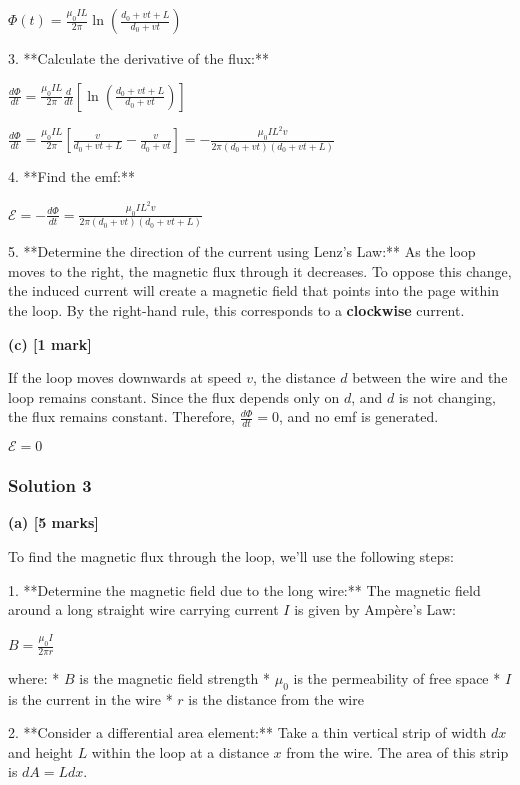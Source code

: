 \documentclass{article}
\begin{document}
   $\Phi(t) = \frac{\mu_0 I L}{2 \pi} \ln \left( \frac{d_0 + vt + L}{d_0 + vt} \right)$

3. **Calculate the derivative of the flux:** 

   $\frac{d\Phi}{dt} = \frac{\mu_0 I L}{2 \pi} \frac{d}{dt} \left[ \ln \left( \frac{d_0 + vt + L}{d_0 + vt} \right) \right]$

   $\frac{d\Phi}{dt} = \frac{\mu_0 I L}{2 \pi} \left[ \frac{v}{d_0 + vt + L} - \frac{v}{d_0 + vt} \right] = -\frac{\mu_0 I L^2 v}{2 \pi (d_0 + vt)(d_0 + vt + L)}$

4. **Find the emf:**

   $\mathcal{E} = -\frac{d\Phi}{dt} = \boxed{\frac{\mu_0 I L^2 v}{2 \pi (d_0 + vt)(d_0 + vt + L)}}$

5. **Determine the direction of the current using Lenz's Law:** As the loop moves to the right, the magnetic flux through it decreases.  To oppose this change, the induced current will create a magnetic field that points into the page within the loop. By the right-hand rule, this corresponds to a \textbf{clockwise} current.


\textbf{(c) [1 mark]}

If the loop moves downwards at speed $v$, the distance $d$ between the wire and the loop remains constant. Since the flux depends only on $d$, and $d$ is not changing, the flux remains constant.  Therefore, $\frac{d\Phi}{dt} = 0$, and no emf is generated.

$\boxed{\mathcal{E} = 0}$


\subsubsection{Solution 3}
\textbf{(a) [5 marks]}

To find the magnetic flux through the loop, we'll use the following steps:

1. **Determine the magnetic field due to the long wire:**
The magnetic field around a long straight wire carrying current $I$ is given by Ampère's Law:

$B = \frac{\mu_0 I}{2 \pi r}$

where:
* $B$ is the magnetic field strength
* $\mu_0$ is the permeability of free space
* $I$ is the current in the wire
* $r$ is the distance from the wire

2. **Consider a differential area element:**
Take a thin vertical strip of width $dx$ and height $L$ within the loop at a distance $x$ from the wire. The area of this strip is $dA = L dx$.
\end{document}
